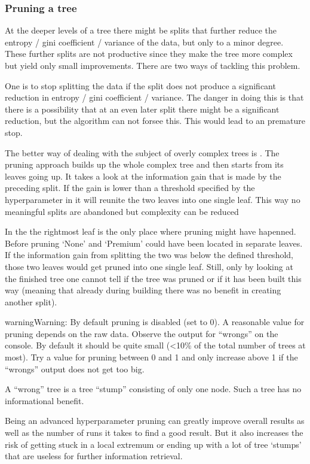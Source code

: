 \documentclass[letterpaper,10pt,english]{sphinxmanual}
\begin{document}
\subsubsection{Pruning a tree}
\label{\detokenize{DT:pruning-a-tree}}
At the deeper levels of a tree there might be splits that further reduce the entropy / gini coefficient / variance of the data, but only to a minor degree.
These further splits are not productive since they make the tree more complex but yield only small improvements.
There are two ways of tackling this problem.

One is to stop splitting the data if the split does not produce a significant reduction in entropy / gini coefficient / variance.
The danger in doing this is that there is a possibility that at an even later split there might be a significant reduction, but the algorithm can not forsee this.
This would lead to an premature stop.

The better way of dealing with the subject of overly complex trees is {\hyperref[\detokenize{DT:prune}]{}}.
The pruning approach builds up the whole complex tree and then starts from its leaves going up.
It takes a look at the information gain that is made by the preceding split.
If the gain is lower than a threshold specified by the  hyperparameter in {\hyperref[\detokenize{execution:execution}]{}} it will reunite the two leaves into one single leaf.
This way no meaningful splits are abandoned but complexity can be reduced

In the {\hyperref[\detokenize{DT:treeview}]{}} the rightmost leaf is the only place where pruning might have hapenned.
Before pruning `None' and `Premium' could have been located in separate leaves.
If the information gain from splitting the two was below the defined threshold, those two leaves would get pruned into one single leaf.
Still, only by looking at the finished tree one cannot tell if the tree was pruned or if it has been built this way (meaning that already during building there was no benefit in creating another split).

\begin{sphinxadmonition}{warning}{Warning:}
By default pruning is disabled (set to 0).
A reasonable value for pruning depends on the raw data.
Observe the output for ``wrongs'' on the console.
By default it should be quite small (\textless{}10\% of the total number of trees at most).
Try a value for pruning between 0 and 1 and only increase above 1 if the ``wrongs'' output does not get too big.

A ``wrong'' tree is a tree ``stump'' consisting of only one node.
Such a tree has no informational benefit.

Being an advanced hyperparameter pruning can greatly improve overall results as well as the number of runs it takes to find a good result.
But it also increases the risk of getting stuck in a local extremum or ending up with a lot of tree `stumps' that are useless for further information retrieval.
\end{sphinxadmonition}
\end{document}
